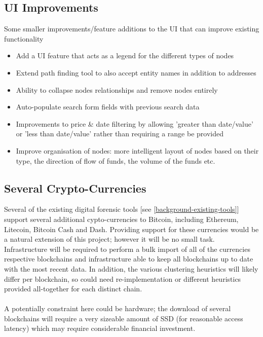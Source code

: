 \subsection{UI Improvements}
Some smaller improvements/feature additions to the UI that can improve existing functionality 
\begin{itemize}
    \item Add a UI feature that acts as a legend for the different types of nodes 
    \item Extend path finding tool to also accept entity names in addition to addresses
    \item Ability to collapse nodes relationships and remove nodes entirely 
    \item Auto-populate search form fields with previous search data 
    \item Improvements to price \& date filtering by allowing 'greater than date/value' or 'less than date/value' rather than requiring a range be provided
    \item Improve organisation of nodes: more intelligent layout of nodes based on their type, the direction of flow of funds, the volume of the funds etc. 
\end{itemize}

\subsection{Several Crypto-Currencies}
Several of the existing digital forensic tools [see \ref{background-existing-tools}] support several additional cypto-currencies to Bitcoin, including Ethereum, Litecoin, Bitcoin Cash and Dash. Providing support for these currencies would be a natural extension of this project; however it will be no small task. Infrastructure will be required to perform a bulk import of all of the currencies respective blockchains and infrastructure able to keep all blockchains up to date with the most recent data. In addition, the various clustering heuristics will likely differ per blockchain, so could need re-implementation or different heuristics provided all-together for each distinct chain. 
\\\\
A potentially constraint here could be hardware; the download of several blockchains will require a very sizeable amount of SSD (for reasonable access latency) which may require considerable financial investment. 